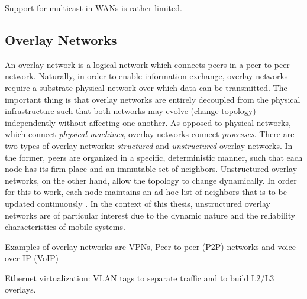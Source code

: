 Support for multicast in WANs is rather limited.



\subsection{Overlay Networks}

An overlay network is a logical network which connects peers in a peer-to-peer network. Naturally, in order to enable information exchange, overlay networks require a substrate physical network over which data can be transmitted. The important thing is that overlay networks are entirely decoupled from the physical infrastructure such that both networks may evolve (change topology) independently without affecting one another. As opposed to physical networks, which connect \emph{physical machines}, overlay networks connect \emph{processes}. There are two types of overlay networks: \emph{structured} and \emph{unstructured} overlay networks. In the former, peers are organized in a specific, deterministic manner, such that each node has its firm place and an immutable set of neighbors. Unstructured overlay networks, on the other hand, allow the topology to change dynamically. In order for this to work, each node maintains an ad-hoc list of neighbors that is to be updated continuously \cite{tanenbaum2017distributed}. In the context of this thesis, unstructured overlay networks are of particular interest due to the dynamic nature and the reliability characteristics of mobile systems.


Examples of overlay networks are VPNs, Peer-to-peer (P2P) networks and voice over IP (VoIP)

Ethernet virtualization: VLAN tags to separate traffic and to build L2/L3 overlays.



